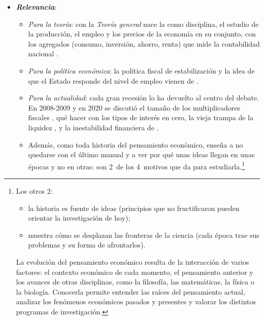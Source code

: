 \documentclass[11pt]{article}
\begin{document}
\begin{itemize}
\item \textbf{\emph{Relevancia}}:
  \begin{itemize}
  \item \emph{Para la teoría}: con la \emph{Teoría general} nace la  como disciplina, el estudio de la producción, el empleo y los precios de la economía en su conjunto, con los agregados (consumo, inversión, ahorro, renta) que mide la contabilidad nacional .
  \item \emph{Para la política económica}: la política fiscal de estabilización y la idea de que el Estado responde del nivel de empleo vienen de .
  \item \emph{Para la actualidad}: cada gran recesión lo ha devuelto al centro del debate. En 2008-2009 y en 2020 se discutió el tamaño de los multiplicadores fiscales\nocite{BlanchardLeigh2013Growth} , qué hacer con los tipos de interés en cero, la vieja trampa de la liquidez , y la inestabilidad financiera de  .
  \item Además, como toda historia del pensamiento económico, enseña a no quedarse con el último manual y a ver por qué unas ideas llegan en unas épocas y no en otras: son 2~de los 4~motivos que da  para estudiarla\nocite{Schumpeter1954History}.\footnote{Los otros 2:
\begin{itemize}
\item la historia es fuente de ideas (principios que no fructificaron pueden orientar la investigación de hoy);
\item muestra cómo se desplazan las fronteras de la ciencia (cada época trae sus problemas y su forma de afrontarlos).
\end{itemize}
La evolución del pensamiento económico resulta de la interacción de varios factores: el contexto económico de cada momento, el pensamiento anterior y los avances de otras disciplinas, como la filosofía, las matemáticas, la física o la biología. Conocerla permite entender las raíces del pensamiento actual, analizar los fenómenos económicos pasados y presentes y valorar los distintos programas de investigación.}
  \end{itemize}


\end{itemize}
\end{document}
